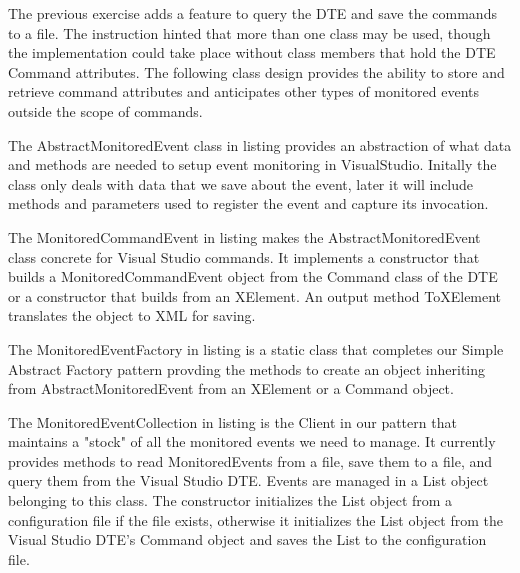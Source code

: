\begin{Answer}
The previous exercise adds a feature to query the DTE and save the commands to a file.  The instruction hinted that more than one class may be used, though the implementation could take place without class members that hold the DTE Command attributes.  The following class design provides the ability to store and retrieve command attributes and anticipates other types of monitored events outside the scope of commands.

The AbstractMonitoredEvent class in listing %
 provides an abstraction of what data and methods are needed to setup event monitoring in VisualStudio.  Initally the class only deals with data that we save about the event, later it will include methods and parameters used to register the event and capture its invocation.

%

The MonitoredCommandEvent in listing %
makes the AbstractMonitoredEvent class concrete for Visual Studio commands.  It implements a constructor that builds a MonitoredCommandEvent object from the Command class of the DTE or a constructor that builds from an XElement.  An output method ToXElement translates the object to XML for saving.
%

The MonitoredEventFactory in listing %
 is a static class that completes our Simple Abstract Factory pattern provding the methods to create an object inheriting from AbstractMonitoredEvent from an XElement or a Command object.  
%

The MonitoredEventCollection in listing %
 is the Client in our pattern that maintains a "stock" of all the monitored events we need to manage.  It currently provides methods to read MonitoredEvents from a file, save them to a file, and query them from the Visual Studio DTE.  Events are managed in a List object belonging to this class.   The constructor initializes the List object from a configuration file if the file exists, otherwise it initializes the List object from the Visual Studio DTE's Command object and saves the List to the configuration file. 
%

\end{Answer}

